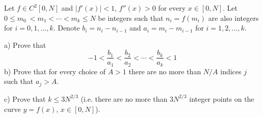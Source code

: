 Let $f\in C^2[0,N]$ and $|f'(x)|<1$, $f''(x)>0$ for every $x\in [0, N]$. Let $0\leq m_0\ <m_1 < \cdots < m_k\leq N$ be integers such that $n_i=f(m_i)$ are also integers for $i=0,1,\ldots, k$. Denote $b_i=n_i-n_{i-1}$ and $a_i=m_i-m_{i-1}$ for $i=1,2,\ldots, k$.

a) Prove that
$$-1<\frac{b_1}{a_1}<\frac{b_2}{a_2}<\cdots < \frac{b_k}{a_k}<1$$
b) Prove that for every choice of $A>1$ there are no more than $N / A$ indices $j$ such that $a_j>A$.

c) Prove that $k\leq 3N^{2/3}$ (i.e. there are no more than $3N^{2/3}$ integer points on the curve $y=f(x)$, $x\in [0,N]$).